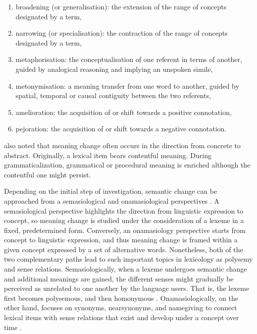 \begin{enumerate}[label={(\arabic*)},nolistsep]
\item broadening (or generalisation): the extension of the range of concepts designated by a term, 
\item narrowing (or specialisation): the contraction of the range of concepts designated by a term, 
\item metaphorisation: the conceptualisation of one referent in terms of another, guided by analogical reasoning and implying an unspoken simile, 
\item metonymisation: a meaning transfer from one word to another, guided by spatial, temporal or causal contiguity between the two referents, 
\item amelioration: the acquisition of or shift towards a positive connotation, 
\item pejoration: the acquisition of or shift towards a negative connotation.
\end{enumerate}
\vspace*{\baselineskip}



  

\textcite[81]{traugott2001regularity} also noted that meaning change often occurs in the direction from concrete to abstract. Originally, a lexical item bears contentful meaning. During grammaticalization, grammatical or procedural meaning is enriched although the contentful one might persist.


Depending on the initial step of investigation, semantic change can be approached from a semasiological and onamasiological perspectives \parencites[17]{geeraerts1997diachronic}[25]{traugott2001regularity}. A semasiological perspective highlights the direction from linguistic expression to concept, so meaning change is studied under the consideration of a lexeme in a fixed, predetermined form. Conversely, an onamasiology perspective starts from concept to linguistic expression, and thus meaning change is framed within a given concept expressed by a set of alternative words. Nonetheless, both of the two complementary paths lead to such important topics in lexicology as polysemy and sense relations. Semasiologically, when a lexeme undergoes semantic change and additional meanings are gained, the different senses might gradually be perceived as unrelated to one another by the language users. That is, the lexeme first becomes polysemous, and then homonymous \parencite[25]{traugott2001regularity}. Onamasiologically, on the other hand, focuses on synonyms, near­synonyms, and name­giving to connect lexical items with sense relations that exist and develop under a concept over time \parencite[17]{geeraerts1997diachronic}.

